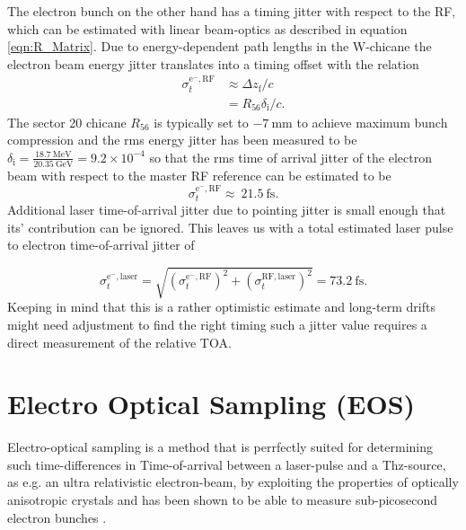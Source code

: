 The electron bunch on the other hand has a timing jitter with respect to the RF, which
can be estimated with linear beam-optics as described in equation \ref{eqn:R_Matrix}.
Due to energy-dependent path lengths in the W-chicane the electron beam energy jitter translates into a  timing offset with the relation
\begin{align}
\sigma_{t}^\mathrm{e^-,RF}&\approx \Delta z_\mathrm{f}/c \\
&=R_{56}\delta_\mathrm{i}/c.
\end{align}
The sector 20 chicane $R_{56}$ is typically set to $-7\ \mathrm{mm}$ to achieve maximum bunch compression  and the rms energy jitter 
has been measured to be $\delta_\mathrm{i}= \frac{18.7\ \mathrm{MeV}}{20.35\ \mathrm{GeV}}=9.2\times10^{-4} $\cite{ThesisGessner} so that the rms time of arrival jitter of the electron beam with respect to the master RF reference can be estimated to be 
\begin{equation}
\sigma_{t}^\mathrm{e^-,RF}\approx\ 21.5\ \mathrm{fs}.
\end{equation} 
Additional laser time-of-arrival jitter due to pointing jitter is small enough that its' contribution can be ignored.
This leaves us with a total estimated laser pulse to electron time-of-arrival jitter of

\begin{equation}
\sigma_{t}^\mathrm{e^-,laser}=\sqrt{(\sigma_{t}^\mathrm{e^-,RF})^2+(\sigma_{t}^\mathrm{RF,laser})^2}=73.2\ \mathrm{fs}.
\end{equation}
Keeping in mind that this is a rather optimistic estimate and long-term drifts might need adjustment to find the right timing such a jitter value requires a direct measurement of the 
relative TOA.

\section{Electro Optical Sampling (EOS)}
\label{sec:EOS}


Electro-optical sampling is a method that is perrfectly suited for determining such time-differences in Time-of-arrival between a laser-pulse and a Thz-source, as e.g. an ultra relativistic electron-beam, by exploiting the properties of optically anisotropic crystals and has been shown to be able to measure sub-picosecond electron bunches \cite{YanX_EOS_PRL2000}.

